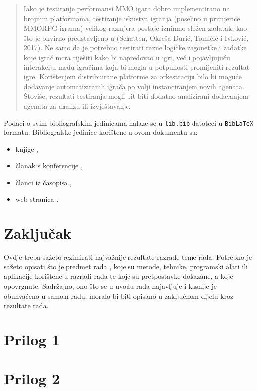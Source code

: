 \documentclass[]{foi}
\begin{document}
\blockquote[{\cite[str. 6]{schatten2020PlatformeZaOrkestraciju}}]{Iako je testiranje performansi MMO igara dobro implementirano na brojnim platformama, testiranje iskustva
igranja (posebno u primjerice MMORPG igrama) velikog razmjera postaje iznimno složen zadatak, kao što
je okvirno predstavljeno u (Schatten, Okreša Ðurić, Tomičić i Ivković, 2017). Ne samo da je potrebno testirati
razne logičke zagonetke i zadatke koje igrač mora riješiti kako bi napredovao u igri, već i pojavljujuću interakciju među igračima koja bi mogla u potpunosti promijeniti rezultat igre. Korištenjem distribuirane platforme za orkestraciju bilo bi moguće dodavanje automatiziranih igrača po volji instanciranjem novih agenata. Štoviše, rezultati testiranja mogli bit biti dodatno
analizirani dodavanjem agenata za analizu ili izvještavanje.}

Podaci o svim bibliografskim jedinicama nalaze se u \texttt{lib.bib} datoteci u \texttt{BibLaTeX} formatu. Bibliografske jedinice korištene u ovom dokumentu su:
\begin{itemize}
    \item knjige \cite{russell2022ArtificialIntelligenceModern,wooldridge2009IntroductionMultiAgentSystems,oraictolic2011AkademskoPismoStrategije},
    \item članak s konferencije \cite{okresaduric2019ModellingFormingTemporary},
    \item članci iz časopisa \cite{SchattenEtAl2016roadmap,rincon2017InfluencingPeopleSocial},
    \item web-stranica \cite{copeland2020ArtificialIntelligence}.
\end{itemize}



\chapter{Zaključak}

Ovdje treba sažeto rezimirati najvažnije rezultate razrade teme rada. Potrebno je sažeto opisati što je predmet rada \cite{copeland2020ArtificialIntelligence}, koje su metode, tehnike, programski alati ili aplikacije korištene u razradi rada te koje su pretpostavke dokazane, a koje opovrgnute. Sadržajno, ono što se u uvodu rada najavljuje i kasnije je obuhvaćeno u samom radu, moralo bi biti opisano u zaključnom dijelu kroz rezultate rada. 

\lipsum[1-2]

\makebackmatter

\appendices %

\chapter{Prilog 1} %

\chapter{Prilog 2} %
\end{document}
